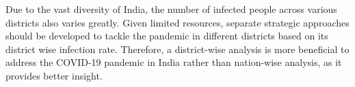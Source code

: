 \documentclass[a4paper,11pt]{article}
\begin{document}
Due to the vast diversity of India, the number of infected people across various districts also varies greatly. Given limited resources, separate strategic approaches should be developed to tackle the pandemic in different districts based on its district wise infection rate. Therefore, a district-wise analysis is more beneficial to address the COVID-19 pandemic in India rather than nation-wise analysis, as it provides better insight. 
\end{document}
